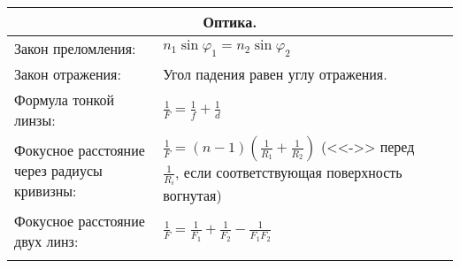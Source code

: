 \documentclass{article}
\begin{document}
\begin{tabular}{ |p{4cm}|p{5.5cm}|p{6cm}|p{3.5cm}|  }
\hline
\multicolumn{4}{|c|}{Оптика.} \\
\hline
Закон преломления:                                                           &  %
$n_1 \sin{\varphi_1} = n_2 \sin{\varphi_2}$                                                                         &  %
                                                                             &  %
                                                                             \\ %
\hline
Закон отражения:                                                             &  %
Угол падения равен углу отражения.                                           &  %
                                                                             &  %
                                                                             \\ %
\hline
Формула тонкой линзы:                                                        &  %
$\frac{1}{F} = \frac{1}{f} + \frac{1}{d}$                                    &  %
                                                                             &  %
                                                                             \\ %
\hline
Фокусное расстояние через радиусы кривизны:                                  &  %
$\frac{1}{F} = (n-1)(\frac{1}{R_1} + \frac{1}{R_2})$ (<<->> перед
$\frac{1}{R_i}$, если соответствующая поверхность вогнутая)                    &  %
                                                                             &  %
                                                                             \\ %
\hline
Фокусное расстояние двух линз:                                               &  %
$\frac{1}{F} = \frac{1}{F_1} + \frac{1}{F_2} - \frac{1}{F_1 F_2}$            &  %
                                                                             &  %
                                                                             \\ %
\hline
                                                                             &  %
                                                                             &  %
                                                                             &  %
                                                                             \\ %

\end{tabular}
\end{document}
